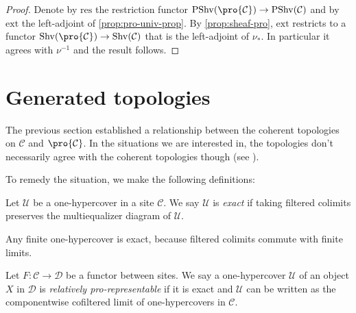 \begin{proof}
    Denote by $\mathrm{res}$ the restriction functor
    $\mathrm{PShv}(\pro{\mathcal{C}}) \to \mathrm{PShv}(\mathcal{C})$ and by
    $\mathrm{ext}$ the left-adjoint of \ref{prop:pro-univ-prop}. By \ref{prop:sheaf-pro},
    $\mathrm{ext}$ restricts to a functor $\mathrm{Shv}(\pro{\mathcal{C}}) \to \mathrm{Shv}(\mathcal{C})$
    that is the left-adjoint of $\nu_*$. In particular it agrees with $\nu^{-1}$ and
    the result follows.
\end{proof}

\section{Generated topologies}

The previous section established a relationship between the coherent topologies on $\mathcal{C}$ and
$\pro{\mathcal{C}}$. In the situations we are interested in, the topologies don't necessarily agree
with the coherent topologies though (see ).

To remedy the situation, we make the following definitions:

\begin{definition}
    Let $\mathcal{U}$ be a one-hypercover in a site $\mathcal{C}$. We say
    $\mathcal{U}$ is \emph{exact} if taking filtered colimits
    preserves the multiequalizer diagram of $\mathcal{U}$.
\end{definition}

\begin{example}
    Any finite one-hypercover is exact, because filtered colimits commute
    with finite limits.
\end{example}

\begin{definition}
    Let $F\colon \mathcal{C} \to \mathcal{D}$ be a functor between sites. We say
    a one-hypercover $\mathcal{U}$ of an object $X$ in $\mathcal{D}$ is
    \emph{relatively pro-representable} if it is exact and $\mathcal{U}$ can be written
    as the componentwise cofiltered limit of one-hypercovers in $\mathcal{C}$.
    \label{def:one-cover-relatively-pro-prepresentable}
    \leanok
\end{definition}

